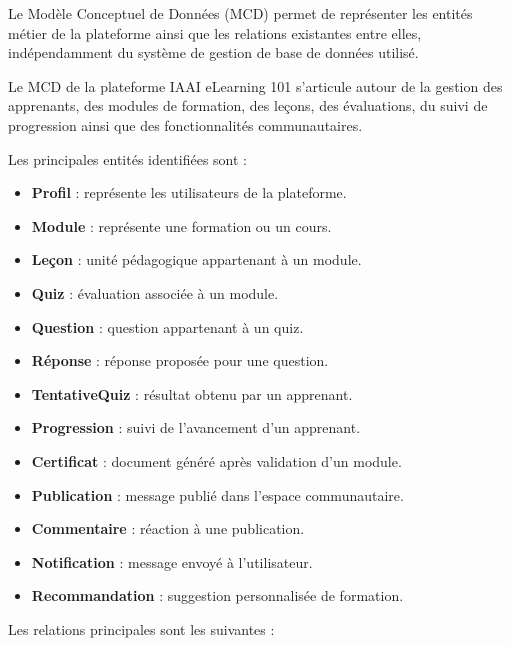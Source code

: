 \documentclass[12pt, a4paper]{report}
\begin{document}
Le Modèle Conceptuel de Données (MCD) permet de représenter les entités
métier de la plateforme ainsi que les relations existantes entre elles,
indépendamment du système de gestion de base de données utilisé.

Le MCD de la plateforme IAAI eLearning 101 s'articule autour de la gestion
des apprenants, des modules de formation, des leçons, des évaluations,
du suivi de progression ainsi que des fonctionnalités communautaires.

Les principales entités identifiées sont :

\begin{itemize}
    \item \textbf{Profil} : représente les utilisateurs de la plateforme.
    \item \textbf{Module} : représente une formation ou un cours.
    \item \textbf{Leçon} : unité pédagogique appartenant à un module.
    \item \textbf{Quiz} : évaluation associée à un module.
    \item \textbf{Question} : question appartenant à un quiz.
    \item \textbf{Réponse} : réponse proposée pour une question.
    \item \textbf{TentativeQuiz} : résultat obtenu par un apprenant.
    \item \textbf{Progression} : suivi de l'avancement d'un apprenant.
    \item \textbf{Certificat} : document généré après validation d'un module.
    \item \textbf{Publication} : message publié dans l'espace communautaire.
    \item \textbf{Commentaire} : réaction à une publication.
    \item \textbf{Notification} : message envoyé à l'utilisateur.
    \item \textbf{Recommandation} : suggestion personnalisée de formation.
\end{itemize}

Les relations principales sont les suivantes :
\end{document}

